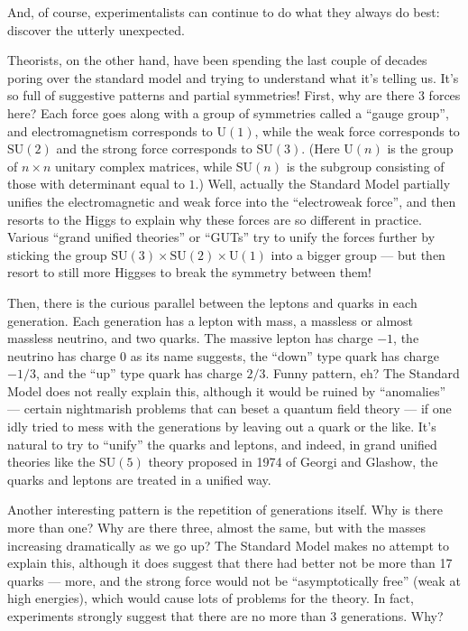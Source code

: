 \documentclass{article}
\def\tightlist{}
\renewcommand{\texttt}[1]{%
  \begingroup
  \ttfamily
  \begingroup\lccode`~=`/\lowercase{\endgroup\def~}{/\discretionary{}{}{}}%
  \begingroup\lccode`~=`[\lowercase{\endgroup\def~}{[\discretionary{}{}{}}%
  \begingroup\lccode`~=`.\lowercase{\endgroup\def~}{.\discretionary{}{}{}}%
  \catcode`/=\active\catcode`[=\active\catcode`.=\active
  \scantokens{#1\noexpand}%
  \endgroup
}
\begin{document}

And, of course, experimentalists can continue to do what they always do
best: discover the utterly unexpected.

Theorists, on the other hand, have been spending the last couple of
decades poring over the standard model and trying to understand what
it's telling us. It's so full of suggestive patterns and partial
symmetries! First, why are there 3 forces here? Each force goes along
with a group of symmetries called a ``gauge group'', and
electromagnetism corresponds to \(\mathrm{U}(1)\), while the weak force
corresponds to \(\mathrm{SU}(2)\) and the strong force corresponds to
\(\mathrm{SU}(3)\). (Here \(\mathrm{U}(n)\) is the group of
\(n\times n\) unitary complex matrices, while \(\mathrm{SU}(n)\) is the
subgroup consisting of those with determinant equal to \(1\).) Well,
actually the Standard Model partially unifies the electromagnetic and
weak force into the ``electroweak force'', and then resorts to the Higgs
to explain why these forces are so different in practice. Various
``grand unified theories'' or ``GUTs'' try to unify the forces further
by sticking the group
\(\mathrm{SU}(3)\times\mathrm{SU}(2)\times\mathrm{U}(1)\) into a bigger
group --- but then resort to still more Higgses to break the symmetry
between them!

Then, there is the curious parallel between the leptons and quarks in
each generation. Each generation has a lepton with mass, a massless or
almost massless neutrino, and two quarks. The massive lepton has charge
\(-1\), the neutrino has charge \(0\) as its name suggests, the ``down''
type quark has charge \(-1/3\), and the ``up'' type quark has charge
\(2/3\). Funny pattern, eh? The Standard Model does not really explain
this, although it would be ruined by ``anomalies'' --- certain
nightmarish problems that can beset a quantum field theory --- if one
idly tried to mess with the generations by leaving out a quark or the
like. It's natural to try to ``unify'' the quarks and leptons, and
indeed, in grand unified theories like the \(\mathrm{SU}(5)\) theory
proposed in 1974 of Georgi and Glashow, the quarks and leptons are
treated in a unified way.

Another interesting pattern is the repetition of generations itself. Why
is there more than one? Why are there three, almost the same, but with
the masses increasing dramatically as we go up? The Standard Model makes
no attempt to explain this, although it does suggest that there had
better not be more than 17 quarks --- more, and the strong force would
not be ``asymptotically free'' (weak at high energies), which would
cause lots of problems for the theory. In fact, experiments strongly
suggest that there are no more than 3 generations. Why?
\end{document}
